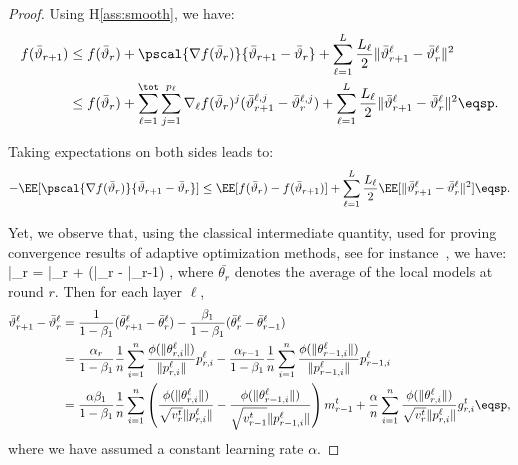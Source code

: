 \documentclass[twoside]{article}
\begin{document}

\begin{proof}
Using H\ref{ass:smooth}, we have:
\begin{align}\notag
f(\bar{\vartheta}_{r+1}) &  \leq f(\bar{\vartheta}_r) + \pscal{\nabla f(\bar{\vartheta}_r)}{\bar{\vartheta}_{r+1} - \bar{\vartheta}_r} + \sum_{\ell =1}^L \frac{L_\ell}{2} \| \bar{\vartheta}^\ell_{r+1} - \bar{\vartheta}^\ell_r \|^2\\\notag
&  \leq f(\bar{\vartheta}_r) + \sum_{\ell=1}^\tot \sum_{j=1}^{p_\ell} \nabla_{\ell} f(\bar{\vartheta}_r)^j (\bar{\vartheta}^{\ell,j}_{r+1} - \bar{\vartheta}^{\ell,j}_r) + \sum_{\ell =1}^L \frac{L_\ell}{2} \| \bar{\vartheta}^\ell_{r+1} - \bar{\vartheta}^\ell_r \|^2  \eqsp.
\end{align}

Taking expectations on both sides leads to:
\begin{align}\label{eq:main}
- \EE[  \pscal{\nabla f(\bar{\vartheta}_r)}{\bar{\vartheta}_{r+1} - \bar{\vartheta}_r}]  \leq  \EE[ f(\bar{\vartheta}_r) - f(\bar{\vartheta}_{r+1})] + \sum_{\ell =1}^L \frac{L_\ell}{2} \EE[  \| \bar{\vartheta}^\ell_{r+1} - \bar{\vartheta}^\ell_r \|^2] \eqsp.
\end{align}

Yet, we observe that, using the classical intermediate quantity, used for proving convergence results of adaptive optimization methods, see for instance~\citep{RKK18}, we have:
\beq\label{eq:defseq}
\bar{\vartheta}_r = \bar{\theta}_r +  (\bar{\theta}_{r} - \bar{\theta}_{r-1}) \eqsp,
\eeq
where $\bar{\theta_r}$ denotes the average of the local models at round $r$.
Then for each layer $\ell$,
\begin{align}\label{eq:gap}
\bar{\vartheta}^\ell_{r+1} - \bar{\vartheta}^\ell_r  & = \frac{1}{1-\beta_1}(\bar{\theta}^\ell_{r+1} - \bar{\theta}^\ell_{r}) - \frac{\beta_1}{1-\beta_1}(\bar{\theta}^\ell_{r} - \bar{\theta}^\ell_{r-1})\\
& = \frac{\alpha_{r}}{1-\beta_1} \frac{1}{n} \sum_{i = 1}^n \frac{\phi(\|\theta_{r,i}^{\ell}\|)}{\|p_{r,i}^{\ell}\|} p_{r,i}^{\ell}  - \frac{\alpha_{r-1}}{1-\beta_1} \frac{1}{n} \sum_{i = 1}^n \frac{\phi(\|\theta_{r-1,i}^{\ell}\|)}{\|p_{r-1,i}^{\ell}\|} p_{r-1,i}^{\ell}\\
& = \frac{\alpha \beta_1}{1-\beta_1} \frac{1}{n}  \sum_{i = 1}^n  \left( \frac{\phi(\|\theta_{r,i}^{\ell}\|)}{\sqrt{v^{t}_{r}} \|p_{r,i}^{\ell}\|} - \frac{\phi(\|\theta_{r-1,i}^{\ell}\|)}{\sqrt{v^{t}_{r-1}} \|p_{r-1,i}^{\ell}\|} \right) m^{t}_{r-1} + \frac{\alpha}{n} \sum_{i = 1}^n \frac{\phi(\|\theta_{r,i}^{\ell}\|)}{\sqrt{v^{t}_{r}} \|p_{r,i}^{\ell}\|} g^t_{r,i} \eqsp,
\end{align}
where we have assumed a constant learning rate $\alpha$.



\end{proof}
\end{document}
